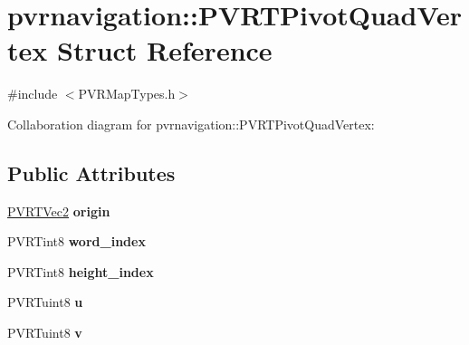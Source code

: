 \hypertarget{structpvrnavigation_1_1_p_v_r_t_pivot_quad_vertex}{\section{pvrnavigation\+:\+:P\+V\+R\+T\+Pivot\+Quad\+Vertex Struct Reference}
\label{structpvrnavigation_1_1_p_v_r_t_pivot_quad_vertex}
}


{\ttfamily \#include $<$P\+V\+R\+Map\+Types.\+h$>$}



Collaboration diagram for pvrnavigation\+:\+:P\+V\+R\+T\+Pivot\+Quad\+Vertex\+:
\subsection*{Public Attributes}
\begin{DoxyCompactItemize}
\item 
\hypertarget{structpvrnavigation_1_1_p_v_r_t_pivot_quad_vertex_a63b1fa8cc6d3e1685ad42e46294950e7}{\hyperlink{struct_p_v_r_t_vec2}{P\+V\+R\+T\+Vec2} {\bfseries origin}}\label{structpvrnavigation_1_1_p_v_r_t_pivot_quad_vertex_a63b1fa8cc6d3e1685ad42e46294950e7}

\item 
\hypertarget{structpvrnavigation_1_1_p_v_r_t_pivot_quad_vertex_a03e372b6394a0f8cd7fae118aa3d085a}{P\+V\+R\+Tint8 {\bfseries word\+\_\+index}}\label{structpvrnavigation_1_1_p_v_r_t_pivot_quad_vertex_a03e372b6394a0f8cd7fae118aa3d085a}

\item 
\hypertarget{structpvrnavigation_1_1_p_v_r_t_pivot_quad_vertex_ae935691cf9da63a6cc0e712c2723a11a}{P\+V\+R\+Tint8 {\bfseries height\+\_\+index}}\label{structpvrnavigation_1_1_p_v_r_t_pivot_quad_vertex_ae935691cf9da63a6cc0e712c2723a11a}

\item 
\hypertarget{structpvrnavigation_1_1_p_v_r_t_pivot_quad_vertex_abea156d162cb1c524b4f1a6241fac2b0}{P\+V\+R\+Tuint8 {\bfseries u}}\label{structpvrnavigation_1_1_p_v_r_t_pivot_quad_vertex_abea156d162cb1c524b4f1a6241fac2b0}

\item 
\hypertarget{structpvrnavigation_1_1_p_v_r_t_pivot_quad_vertex_a239e040a33327ef0f1240274347cf9b3}{P\+V\+R\+Tuint8 {\bfseries v}}\label{structpvrnavigation_1_1_p_v_r_t_pivot_quad_vertex_a239e040a33327ef0f1240274347cf9b3}

\end{DoxyCompactItemize}


